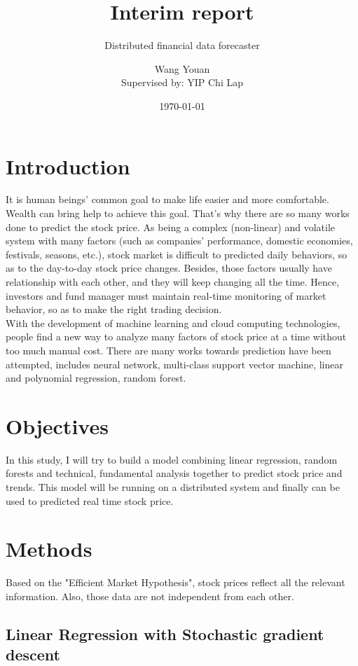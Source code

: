 \documentclass[12pt,a4paper]{scrartcl}
\title{Interim report}
\subtitle{Distributed financial data forecaster}
\author{Wang Youan\\{\small Supervised by: YIP Chi Lap}}
\date{\today}
\begin{document}
	\maketitle
	\section{Introduction}
	It is human beings' common goal to make life easier and more comfortable. Wealth can bring help to achieve this goal. That's why there are so many works done to predict the stock price. As being a complex (non-linear) and volatile system with many factors (such as companies' performance, domestic economies, festivals, seasons, etc.)\cite{chen1986economic}, stock market is difficult to predicted daily behaviors, so as to the day-to-day stock price changes. Besides, those factors usually have relationship with each other, and they will keep changing all the time. Hence, investors and fund manager must maintain real-time monitoring of market behavior, so as to make the right trading decision.\\
	\indent With the development of machine learning and cloud computing technologies, people find a new way to analyze many factors of stock price at a time without too much manual cost. There are many works towards prediction have been attempted, includes neural network\cite{kimoto1990stock,naeini2010stock}, multi-class support vector machine\cite{kercheval2015modelling}, linear and polynomial regression\cite{nunnostock,alexanderstock}, random forest\cite{alexanderstock,lauretto2013evaluation}.
	\section{Objectives}
	In this study, I will try to build a model combining linear regression, random forests and technical, fundamental analysis together to predict stock price and trends. This model will be running on a distributed system and finally can be used to predicted real time stock price.
	\section{Methods}
	Based on the "Efficient Market Hypothesis"\cite{basu1977investment}, stock prices reflect all the relevant information. Also, those data are not independent from each other.
	\subsection{Linear Regression with Stochastic gradient descent}
\end{document}
